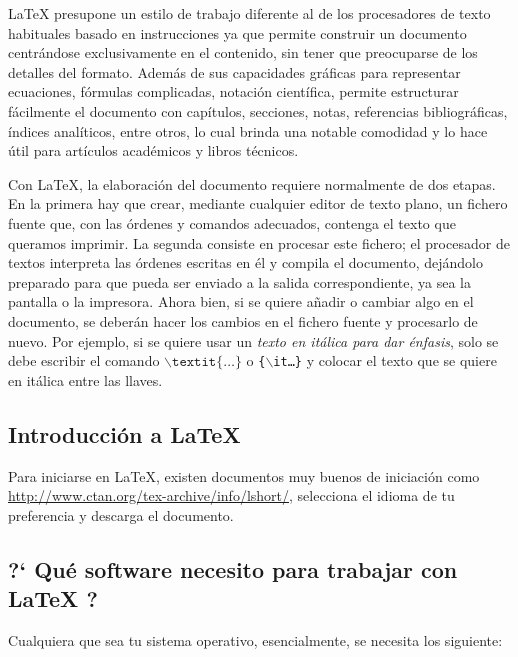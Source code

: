 \LaTeX{} presupone un estilo de trabajo diferente al de los procesadores de texto habituales basado en instrucciones ya que permite construir un documento centr\'{a}ndose exclusivamente en el contenido, sin tener que preocuparse de los detalles del formato. Adem\'{a}s de sus capacidades gr\'{a}ficas para representar ecuaciones, f\'{o}rmulas complicadas, notaci\'{o}n cient\'{i}fica, permite estructurar f\'{a}cilmente el documento con cap\'{i}tulos, secciones, notas, referencias bibliogr\'{a}ficas, índices anal\'{i}ticos, entre otros, lo cual brinda una notable comodidad y lo hace \'{u}til para art\'{i}culos acad\'{e}micos y libros t\'{e}cnicos.

Con \LaTeX{}, la elaboraci\'{o}n del documento requiere normalmente de dos etapas. En la primera hay que crear, mediante cualquier editor de texto plano, un fichero fuente que, con las \'{o}rdenes y comandos adecuados, contenga el texto que queramos imprimir. La segunda consiste en procesar este fichero; el procesador de textos interpreta las \'{o}rdenes escritas en \'{e}l y compila el documento, dej\'{a}ndolo preparado para que pueda ser enviado a la salida correspondiente, ya sea la pantalla o la impresora. Ahora bien, si se quiere añadir o cambiar algo en el documento, se deberán hacer los cambios en el fichero fuente y procesarlo de nuevo. Por ejemplo, si se quiere usar un \textit{texto en it\'{a}lica para dar \'{e}nfasis}, solo se debe escribir el comando  $\backslash\texttt{textit}\{\ldots\}$ o \texttt{\{$\backslash$it\ldots\}} y colocar el texto que se quiere en it\'{a}lica entre las llaves.


\subsection{Introducción a \LaTeX{}}

Para iniciarse en \LaTeX{}, existen documentos muy buenos de iniciaci\'{o}n como \url{http://www.ctan.org/tex-archive/info/lshort/}, selecciona el idioma de tu preferencia y descarga el documento. 

\subsection{?` Qué software necesito para trabajar con \LaTeX{} ?}

Cualquiera que sea tu sistema operativo, esencialmente, se necesita los siguiente:

